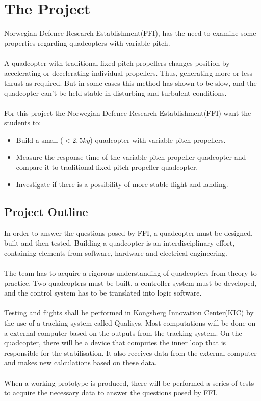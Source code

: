 \section{The Project}

Norwegian Defence Research Establishment(FFI), has the need to examine some properties regarding quadcopters with variable pitch. \\
\\
A quadcopter with traditional fixed-pitch propellers changes position by accelerating or decelerating individual propellers. Thus, generating more or less thrust as required.
But in some cases this method has shown to be slow, and the quadcopter can't be held stable in disturbing and turbulent conditions.\\
\\
For this project the Norwegian Defence Research Establishment(FFI) want the students to:
\begin{itemize}
    \item Build a small ($<2,5kg$) quadcopter with variable pitch propellers.
    \item Measure the response-time of the variable pitch propeller quadcopter and compare it to traditional fixed pitch propeller quadcopter. 
    \item Investigate if there is a possibility of more stable flight and landing. 
\end{itemize}

\subsection{Project Outline} 
In order to answer the questions posed by FFI, a quadcopter must be designed, built and then tested. Building a quadcopter is an interdisciplinary effort, containing elements from software, hardware and electrical engineering. \\
\\
The team has to acquire a rigorous understanding of quadcopters from theory to practice. Two quadcopters must be built, a controller system must be developed, and the control system has to be translated into logic software.\\
\\
Testing and flights shall be performed in Kongsberg Innovation Center(KIC) by the use of a tracking system called Qualisys. Most computations will be done on a external computer based on the outputs from the tracking system. On the quadcopter, there will be a device that computes the inner loop that is responsible for the stabilisation. It also receives data from the external computer and makes new calculations based on these data.\\
\\
When a working prototype is produced, there will be performed a series of tests to acquire the necessary data to answer the questions posed by FFI.

